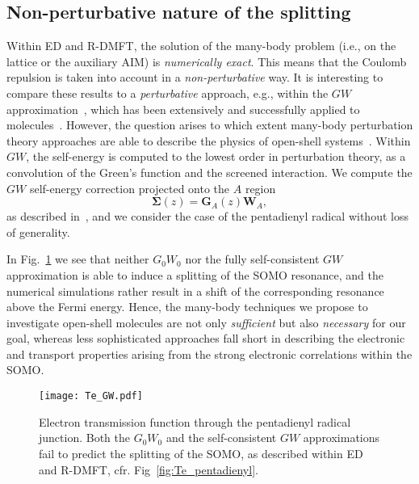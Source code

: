 \documentclass[aps,prx,twocolumn,superscriptaddress]{revtex4-2}
\begin{document}
\subsection{Non-perturbative nature of the splitting }
Within ED and R-DMFT, the solution of the many-body problem (i.e., on the lattice or the auxiliary AIM) 
is \emph{numerically exact}. 
This means that the Coulomb repulsion is taken into account in a \emph{non-perturbative} way. 
It is interesting to compare these results to a \emph{perturbative} approach, 
e.g., within the $GW$ approximation~\cite{hedinPR139,aryasetiawanRPP61}, 
which has been extensively and successfully applied 
to molecules~\cite{stanEPL76,neatonPRL97,thygesenJCP126,thygesenPRB77,rostgaardPRB81,strangePRB83}. 
However, the question arises to which extent many-body perturbation theory approaches 
are able to describe the physics of open-shell systems~\cite{mansouriNJP23}. 
Within $GW$, the self-energy is computed to the lowest order in perturbation theory, 
as a convolution of the Green's function and the screened interaction. 
We compute the $GW$ self-energy correction projected onto the $A$ region 
\begin{equation}
 \mathbf{\Sigma}(z) = \mathbf{G}_A(z) \mathbf{W}_A, 
\end{equation}
as described in~\cite{gandus2020efficient}, and we consider the case of the pentadienyl radical without loss of generality. 

In Fig.~\ref{fig:Te_GW} we see that neither $G_0W_0$ nor the fully self-consistent $GW$ approximation 
is able to induce a splitting of the SOMO resonance, 
and the numerical simulations rather result in a shift of the corresponding resonance above the Fermi energy. 
Hence, the many-body techniques we propose to investigate open-shell molecules 
are not only \emph{sufficient} but also \emph{necessary} 
for our goal, whereas less sophisticated approaches fall short 
in describing the electronic and transport properties 
arising from the strong electronic correlations within the SOMO. 

\begin{figure}[tp]
\texttt{[image: Te\_GW.pdf]}
\caption{Electron transmission function through the pentadienyl radical junction. 
Both the $G_0W_0$ and the self-consistent $GW$ approximations fail to predict the splitting of the SOMO, 
as described within ED and R-DMFT, cfr. Fig~\ref{fig:Te_pentadienyl}. }
\label{fig:Te_GW}  
\end{figure}
\end{document}
